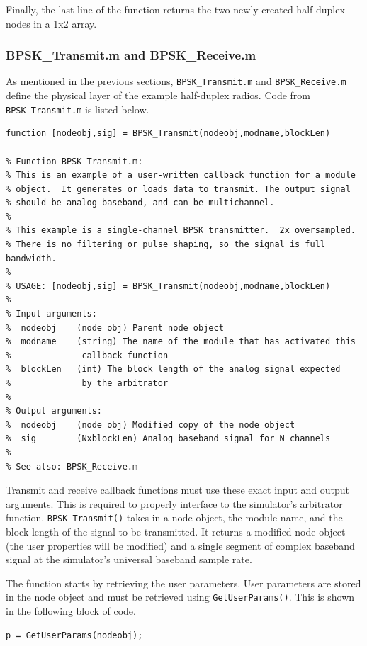 Finally, the last line of the function returns the two newly created
half-duplex nodes in a 1x2 array.

\subsubsection{BPSK\_Transmit.m and BPSK\_Receive.m}

As mentioned in the previous sections, \verb+BPSK_Transmit.m+ and
\verb+BPSK_Receive.m+ define the physical layer of the example
half-duplex radios.  Code from \verb+BPSK_Transmit.m+ is listed
below.

\begin{lstlisting}[name=bpskTx]
function [nodeobj,sig] = BPSK_Transmit(nodeobj,modname,blockLen)

% Function BPSK_Transmit.m:
% This is an example of a user-written callback function for a module
% object.  It generates or loads data to transmit. The output signal 
% should be analog baseband, and can be multichannel.
%
% This example is a single-channel BPSK transmitter.  2x oversampled.
% There is no filtering or pulse shaping, so the signal is full bandwidth.
%
% USAGE: [nodeobj,sig] = BPSK_Transmit(nodeobj,modname,blockLen)
%
% Input arguments:
%  nodeobj    (node obj) Parent node object
%  modname    (string) The name of the module that has activated this
%              callback function
%  blockLen   (int) The block length of the analog signal expected
%              by the arbitrator
%
% Output arguments:
%  nodeobj    (node obj) Modified copy of the node object
%  sig        (NxblockLen) Analog baseband signal for N channels
%
% See also: BPSK_Receive.m
\end{lstlisting}

Transmit and receive callback functions must use these exact input
and output arguments.  This is required to properly interface to the
simulator's arbitrator function.  \verb+BPSK_Transmit()+ takes in a
node object, the module name, and the block length of the signal to
be transmitted.  It returns a modified node object (the user
properties will be modified) and a single segment of complex
baseband signal at the simulator's universal baseband sample rate.

The function starts by retrieving the user parameters.  User
parameters are stored in the node object and must be retrieved using
\verb+GetUserParams()+.  This is shown in the following block of
code.

\begin{lstlisting}[firstnumber=31, name=bpskTx]
% Load user parameters
p = GetUserParams(nodeobj);

\end{lstlisting}

